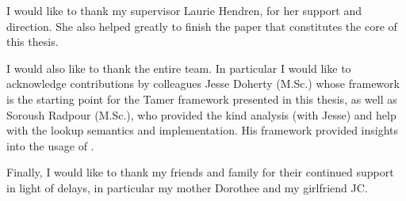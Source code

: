 

I would like to thank my supervisor Laurie Hendren, for 
her support and direction. She also helped greatly
to finish the paper that constitutes the core of this thesis.

I would also like to thank the entire \mclab team.  In particular I
would like to acknowledge contributions by colleagues Jesse Doherty
(M.Sc.) whose \mcsaf framework is the starting point for the Tamer
framework presented in this thesis, as well as Soroush Radpour (M.Sc.),
who provided the kind analysis (with Jesse) and help with the lookup
semantics and implementation. His \mcbench framework provided insights
into the usage of \matlab.

Finally, I would like to thank my friends and family for their
continued support in light of delays, in particular my mother
Dorothee and my girlfriend JC.

